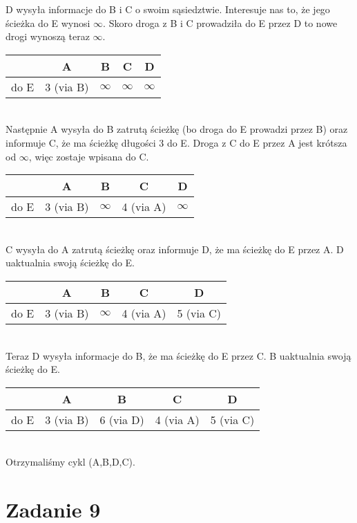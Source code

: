 \documentclass[11pt,wide]{article}
\begin{document}
D wysyła informacje do B i C o swoim sąsiedztwie. Interesuje nas to, że jego ścieżka do E wynosi $\infty$.
Skoro droga z B i C prowadziła do E przez D to nowe drogi wynoszą teraz $\infty$.\\
\begin{tabular}{|c|c|c|c|c|}\hline
 & A & B & C & D \\
 \hline
 do E & 3 (via B) & $\infty$ & $\infty$ & $\infty$\\
 \hline
\end{tabular}\\

Następnie A wysyła do B zatrutą ścieżkę (bo droga do E prowadzi przez B) oraz informuje C, że ma ścieżkę długości 3 do E. Droga z C do E przez A jest krótsza od $\infty$, więc zostaje wpisana do C.\\
\begin{tabular}{|c|c|c|c|c|}\hline
 & A & B & C & D \\
 \hline
 do E & 3 (via B) & $\infty$ & 4 (via A) & $\infty$\\
 \hline
\end{tabular}\\

C wysyła do A zatrutą ścieżkę oraz informuje D, że ma ścieżkę do E przez A. D uaktualnia swoją ścieżkę do E.\\
\begin{tabular}{|c|c|c|c|c|}\hline
 & A & B & C & D \\
 \hline
 do E & 3 (via B) & $\infty$ & 4 (via A) & 5 (via C)\\
 \hline
\end{tabular}\\

Teraz D wysyła informacje do B, że ma ścieżkę do E przez C. B uaktualnia swoją ścieżkę do E.\\
\begin{tabular}{|c|c|c|c|c|}\hline
 & A & B & C & D \\
 \hline
 do E & 3 (via B) & 6 (via D) & 4 (via A) & 5 (via C)\\
 \hline
\end{tabular}\\

Otrzymaliśmy cykl (A,B,D,C).


\section{Zadanie 9}
\end{document}
